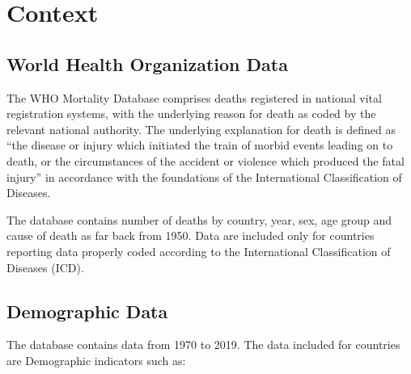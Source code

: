 

\section{Context}

\subsection{World Health Organization Data}

The WHO Mortality Database comprises deaths registered in national vital registration systems, with the underlying reason for death as coded by the relevant national authority. The underlying explanation for death is defined as “the disease or injury which initiated the train of morbid events leading on to death, or the circumstances of the accident or violence which produced the fatal injury” in accordance with the foundations of the International Classification of Diseases.

The database contains number of deaths by country, year, sex, age group and cause of death as far back from 1950. Data are included only for countries reporting data properly coded according to the International Classification of Diseases (ICD).


\subsection{Demographic Data}

The database contains data from 1970 to 2019. The data included for countries are Demographic indicators such as:

